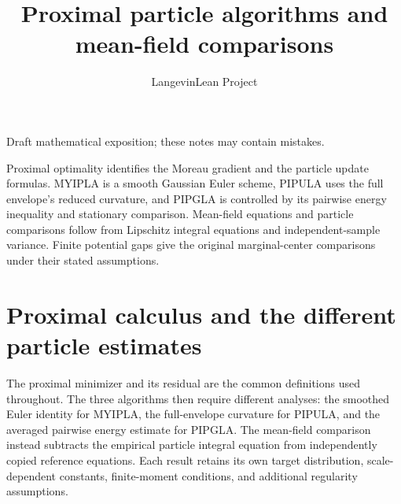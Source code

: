 \documentclass[11pt,a4paper]{article}
\title{\texorpdfstring{Proximal particle algorithms and mean-field comparisons}{Proximal particle algorithms and mean-field comparisons}}
\author{LangevinLean Project}
\date{}
\begin{document}
\maketitle
Draft mathematical exposition; these notes may contain mistakes.


Proximal optimality identifies the Moreau gradient and the particle update formulas. MYIPLA is a smooth Gaussian Euler scheme, PIPULA uses the full envelope’s reduced curvature, and PIPGLA is controlled by its pairwise energy inequality and stationary comparison. Mean-field equations and particle comparisons follow from Lipschitz integral equations and independent-sample variance. Finite potential gaps give the original marginal-center comparisons under their stated assumptions.



\section{\texorpdfstring{Proximal calculus and the different particle estimates}{Proximal calculus and the different particle estimates}}


The proximal minimizer and its residual are the common definitions used throughout. The three algorithms then require different analyses: the smoothed Euler identity for MYIPLA, the full-envelope curvature for PIPULA, and the averaged pairwise energy estimate for PIPGLA. The mean-field comparison instead subtracts the empirical particle integral equation from independently copied reference equations. Each result retains its own target distribution, scale-dependent constants, finite-moment conditions, and additional regularity assumptions.
\end{document}
